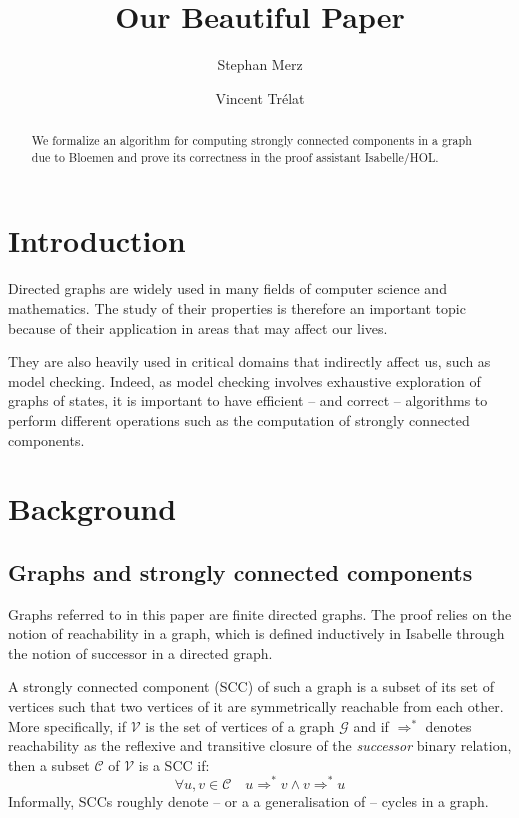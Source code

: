 \documentclass[sigplan,10pt,anonymous,review]{acmart}
\title{Our Beautiful Paper}
\author{Stephan Merz}
\affiliation{
  \institution{University of Lorraine, CNRS, Inria, LORIA}
  \city{Nancy}
  \country{France}
}
\author{Vincent Trélat}
\affiliation{
  \institution{University of Lorraine}
  \city{Nancy}
  \country{France}
}
\begin{document}
\begin{abstract}
  We formalize an algorithm for computing strongly connected components in a graph due to Bloemen and prove its correctness in the proof assistant Isabelle/HOL.
\end{abstract}

\maketitle

\section{Introduction}
\label{sec:introduction}
Directed graphs are widely used in many fields of computer science and mathematics.
The study of their properties is therefore an important topic because of their application in areas that may affect our lives.

They are also heavily used in critical domains that indirectly affect us, such as model checking.
Indeed, as model checking involves exhaustive exploration of graphs of states, it is important to have efficient -- and correct -- algorithms to perform different operations such as the computation of strongly connected components.

\section{Background}
\label{sec:background}

\subsection{Graphs and strongly connected components}
\label{sec:graphs}
Graphs referred to in this paper are finite directed graphs.
The proof relies on the notion of reachability in a graph, which is defined inductively in Isabelle through the notion of successor in a directed graph.

A strongly connected component (SCC) of such a graph is a subset of its set of vertices such that two vertices of it are symmetrically reachable from each other.
More specifically, if $\mathcal{V}$ is the set of vertices of a graph $\mathcal{G}$ and if $\Rightarrow^*$ denotes reachability as the reflexive and transitive closure of the \emph{successor} binary relation, then a subset $\mathcal{C}$ of $\mathcal{V}$ is a SCC if:
\begin{equation*}
  \forall u, v \in \mathcal{C} \quad u \Rightarrow^* v \wedge v \Rightarrow^* u
\end{equation*}
Informally, SCCs roughly denote -- or a a generalisation of -- cycles in a graph.
\end{document}

